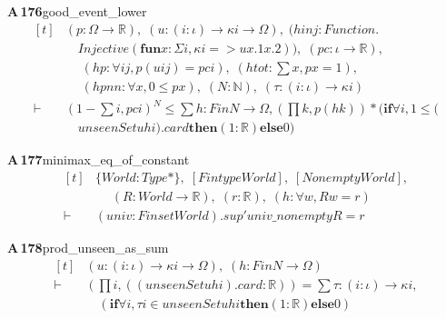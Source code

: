 \documentclass[conference]{IEEEtran}
\theoremstyle{definition}
\newcommand{\lean}[1]{\textsf{\footnotesize #1}}
\begin{document}
\noindent\textbf{A\,176}\quad\lean{good\_event\_lower}
{\footnotesize\[ \begin{aligned}[t]
&(\mathit{p} : \Omega \to \mathbb{R} ),\; (\mathit{u} : (\mathit{i} : \iota ) \to \kappa \mathit{i} \to \Omega ),\; (\mathit{hinj} : \mathit{Function}.\\
&\quad \mathit{Injective} (\mathbf{fun} \mathit{x} : \Sigma \mathit{i}, \kappa \mathit{i} => \mathit{u} \mathit{x}.1 \mathit{x}.2)),\; (\mathit{pc} : \iota \to \mathbb{R} ),\\
&\quad \; (\mathit{hp} : \forall \mathit{i} \mathit{j}, \mathit{p} (\mathit{u} \mathit{i} \mathit{j}) = \mathit{pc} \mathit{i}),\; (\mathit{htot} : \textstyle\sum \mathit{x}, \mathit{p} \mathit{x} = 1),\\
&\quad \; (\mathit{hpnn} : \forall \mathit{x}, 0 \leq \mathit{p} \mathit{x}),\; (\mathit{N} : \mathbb{N} ),\; (\tau : (\mathit{i} : \iota ) \to \kappa \mathit{i})\\
\vdash\;&(1 - \textstyle\sum \mathit{i}, \mathit{pc} \mathit{i}) ^{\mathit{N}} \leq \textstyle\sum \mathit{h} : \mathit{Fin} \mathit{N} \to \Omega , (\textstyle\prod \mathit{k}, \mathit{p} (\mathit{h} \mathit{k})) * (\mathbf{if} \forall \mathit{i}, 1 \leq (\\
&\quad \mathit{unseenSet} \mathit{u} \mathit{h} \mathit{i}).\mathit{card} \mathbf{then} (1:\mathbb{R} ) \mathbf{else} 0)
\end{aligned} \]}

\noindent\textbf{A\,177}\quad\lean{minimax\_eq\_of\_constant}
{\footnotesize\[ \begin{aligned}[t]
&\{ \mathit{World} : \mathit{Type}*\},\; [\mathit{Fintype} \mathit{World}],\; [\mathit{Nonempty} \mathit{World}],\\
&\quad \; (\mathit{R} : \mathit{World} \to \mathbb{R} ),\; (\mathit{r} : \mathbb{R} ),\; (\mathit{h} : \forall \mathit{w}, \mathit{R} \mathit{w} = \mathit{r})\\
\vdash\;&(\mathit{univ} : \mathit{Finset} \mathit{World}).\mathit{sup'} \mathit{univ\_nonempty} \mathit{R} = \mathit{r}
\end{aligned} \]}

\noindent\textbf{A\,178}\quad\lean{prod\_unseen\_as\_sum}
{\footnotesize\[ \begin{aligned}[t]
&(\mathit{u} : (\mathit{i} : \iota ) \to \kappa \mathit{i} \to \Omega ),\; (\mathit{h} : \mathit{Fin} \mathit{N} \to \Omega )\\
\vdash\;&(\textstyle\prod \mathit{i}, ((\mathit{unseenSet} \mathit{u} \mathit{h} \mathit{i}).\mathit{card} : \mathbb{R} )) = \textstyle\sum \tau : (\mathit{i} : \iota ) \to \kappa \mathit{i},\\
&\quad (\mathbf{if} \forall \mathit{i}, \tau \mathit{i} \in \mathit{unseenSet} \mathit{u} \mathit{h} \mathit{i} \mathbf{then} (1:\mathbb{R} ) \mathbf{else} 0)
\end{aligned} \]}
\end{document}
